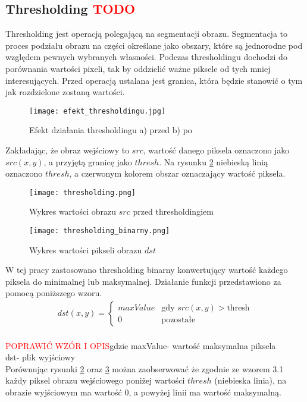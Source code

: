 \subsection{Thresholding \textcolor{red}{TODO}}
Thresholding jest operacją polegającą na segmentacji obrazu. Segmentacja to proces podziału obrazu na części określane jako obszary, które są jednorodne pod względem pewnych wybranych własności. Podczas thresholdingu dochodzi do porównania wartości pixeli, tak by oddzielić ważne piksele od tych mniej interesujących. Przed operacją ustalana jest granica, która będzie stanowić o tym jak rozdzielone zostaną wartości.
\begin{figure}[H]
	\centering
	\texttt{[image: efekt\_thresholdingu.jpg]}
	\caption{Efekt działania thresholdingu a) przed b) po}
	\label{fig:efekt_thresholdingu}
\end{figure}
Zakładając, że obraz wejściowy to $src$, wartość danego piksela oznaczono jako $src(x,y) $, a przyjętą granicę jako $thresh$. Na rysunku \ref{fig:thresholding} niebieską linią oznaczono $thresh$, a czerwonym kolorem obszar oznaczający wartość piksela. 
\begin{figure}[H]
	\centering
	\texttt{[image: thresholding.png]}
	\caption{Wykres wartości obrazu $src$ przed thresholdingiem}
	\label{fig:thresholding}
\end{figure}
\begin{figure}[H]
	\centering
	\texttt{[image: thresholding\_binarny.png]}
	\caption{Wykres wartości pikseli obrazu $dst$}
	\label{fig:thresholding_binarny}
\end{figure}
W tej pracy zastosowano thresholding binarny konwertujący wartość każdego piksela do minimalnej lub maksymalnej. Działanie funkcji przedstawiono za pomocą poniższego wzoru.
 \begin{equation}
 \label{eq:thresholding}
 \begin{aligned}
dst(x,y) = \left\{ \begin{array}{ll}
maxValue & \textrm{gdy $src(x,y)>$thresh}\\
0 & \textrm{pozostałe}
\end{array} \right.
 \end{aligned}
\end{equation}
 \\ \textcolor{red}{POPRAWIĆ WZÓR I OPIS}gdzie maxValue- wartość maksymalna piksela
 \\ dst- plik wyjściowy \\
Porównując rysunki \ref{fig:thresholding} oraz \ref{fig:thresholding_binarny} można zaobserwować że zgodnie ze wzorem 3.1 każdy piksel obrazu wejściowego poniżej wartości $thresh$ (niebieska linia), na obrazie wyjściowym ma wartość 0, a powyżej linii ma wartość maksymalną.

